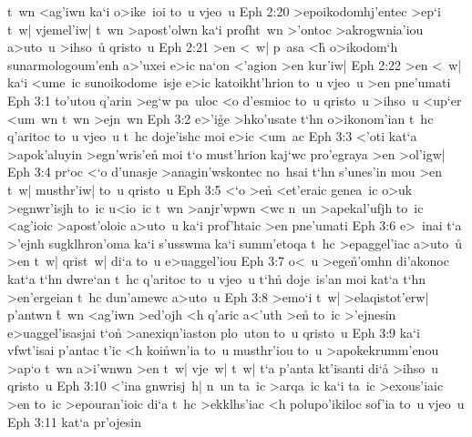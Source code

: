 t~wn
<ag'iwn
ka`i
o>ike~ioi
to~u
vjeo~u\bibvsend
\vs Eph 2:20
>epoikodomhj'entec
>ep`i
t~w|
vjemel'iw|
t~wn
>apost'olwn
ka`i
profht~wn
>'ontoc
>akrogwnia'iou
a>uto~u
>ihso~u\r{}
qristo~u\bibvsend
\vs Eph 2:21
>en
<~w|
p~asa
<h\r{}
o>ikodom`h
sunarmologoum'enh
a>'uxei
e>ic
na`on
<'agion
>en
kur'iw|\bibvsend
\vs Eph 2:22
>en
<~w|
ka`i
<ume~ic
sunoikodome~isje
e>ic
katoikht'hrion
to~u
vjeo~u
>en
pne'umati\bibvsend
\vs Eph 3:1
to'utou
q'arin
>eg`w
pa~uloc
<o
d'esmioc
to~u
qristo~u
>ihso~u
<up`er
<um~wn
t~wn
>ejn~wn\bibvsend
\vs Eph 3:2
e>'i\r{g}e
>hko'usate
t`hn
o>ikonom'ian
t~hc
q'aritoc
to~u
vjeo~u
t~hc
doje'ishc
moi
e>ic
<um~ac\bibvsend
\vs Eph 3:3
<'oti
kat`a
>apok'aluyin
>egn'wris'e\r{n}
moi
t`o
must'hrion
kaj`wc
pro'egraya
>en
>ol'igw|\bibvsend
\vs Eph 3:4
pr`oc
<`o
d'unasje
>anagin'wskontec
no~hsai
t`hn
s'unes'in
mou
>en
t~w|
musthr'iw|
to~u
qristo~u\bibvsend
\vs Eph 3:5
<`o
>e\r{n}
<et'eraic
genea~ic
o>uk
>egnwr'isjh
to~ic
u<io~ic
t~wn
>anjr'wpwn
<wc
n~un
>apekal'ufjh
to~ic
<ag'ioic
>apost'oloic
a>uto~u
ka`i
prof'htaic
>en
pne'umati\bibvsend
\vs Eph 3:6
e>~inai
t`a
>'ejnh
sugklhron'oma
ka`i
s'usswma
ka`i
summ'etoqa
t~hc
>epaggel'iac
a>uto~u\r{}
>en
t~w|
qrist~w|
di`a
to~u
e>uaggel'iou\bibvsend
\vs Eph 3:7
o<~u
>ege\r{n}'omhn
di'akonoc
kat`a
t`hn
dwre`an
t~hc
q'aritoc
to~u
vjeo~u
t`hn\r{}
doje~is'an
moi
kat`a
t`hn
>en'ergeian
t~hc
dun'amewc
a>uto~u\bibvsend
\vs Eph 3:8
>emo`i
t~w|
>elaqistot'erw|
p'antwn
\r{t}~wn
<ag'iwn
>ed'ojh
<h
q'aric
a<'uth
>e\r{n}
to~ic
>'ejnesin
e>uaggel'isasjai
t`on\r{}
>anexiqn'iaston
plo~uton
to~u
qristo~u\bibvsend
\vs Eph 3:9
ka`i
vfwt'isai
p'antac
t'ic
<h
koi\r{n}wn'ia
to~u
musthr'iou
to~u
>apokekrumm'enou
>ap`o
t~wn
a>i'wnwn
>en
t~w|
vje~w|
t~w|
t`a
p'anta
kt'isanti
di`a\r{}
>ihso~u
qristo~u\bibvsend
\vs Eph 3:10
<'ina
gnwrisj~h|
n~un
ta~ic
>arqa~ic
ka`i
ta~ic
>exous'iaic
>en
to~ic
>epouran'ioic
di`a
t~hc
>ekklhs'iac
<h
polupo'ikiloc
sof'ia
to~u
vjeo~u\bibvsend
\vs Eph 3:11
kat`a
pr'ojesin
